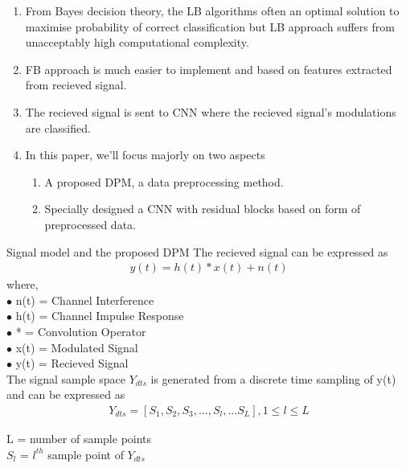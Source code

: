 \documentclass{beamer}
\begin{document}
\begin{frame}
\begin{enumerate}[]
    
    \item From Bayes decision theory, the LB algorithms often an optimal solution to maximise probability of correct classification but LB approach suffers from unacceptably high computational complexity.
    \item FB approach is much easier to implement and based on features extracted from recieved signal.
    \item The recieved signal is sent to CNN where the recieved signal's modulations are classified.
    \item In this paper, we'll focus majorly on two aspects
    \begin{enumerate}[]
        \item A proposed DPM, a data preprocessing method.
        \item Specially designed a CNN with residual blocks based on form of preprocessed data.
    \end{enumerate}
\end{enumerate}
\end{frame}
\begin{frame}{Signal model and the proposed DPM }
    The recieved signal can be expressed as 
    \begin{align}
        y(t)=h(t)*x(t)+n(t)
    \end{align}
where,\\
$\bullet$ n(t) = Channel Interference\\
$\bullet$ h(t) = Channel Impulse Response\\
$\bullet$ * = Convolution Operator\\
$\bullet$ x(t) = Modulated Signal\\
$\bullet$ y(t) = Recieved Signal\\

The signal sample space $Y_{dts}$ is generated from a discrete time sampling of y(t) and can be expressed as 
\begin{align}
    Y_{dts}=[S_{1},S_{2},S_{3},...,S_{l},...S_{L}] , 1\le l \le L
\end{align}
 
 L = number of sample points\\
 $S_{l}$ = $l^{th}$ sample point of $Y_{dts}$
 
\end{frame}
\end{document}
